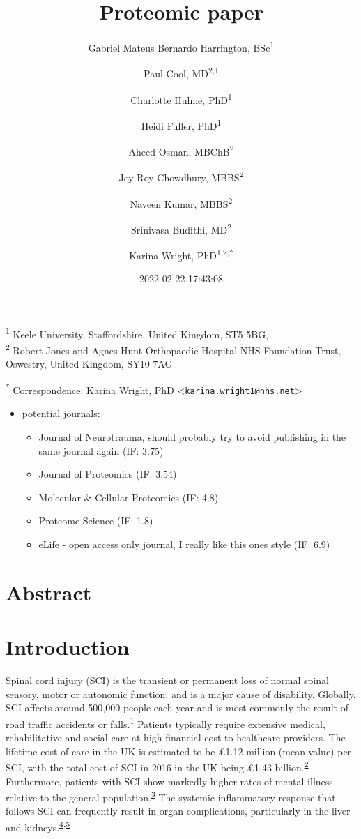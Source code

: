 \documentclass[
]{article}
\title{Proteomic paper}
\author{Gabriel Mateus Bernardo Harrington, BSc\textsuperscript{1} \and Paul Cool, MD\textsuperscript{2,1} \and Charlotte Hulme, PhD\textsuperscript{1} \and Heidi Fuller, PhD\textsuperscript{1} \and Aheed Osman, MBChB\textsuperscript{2} \and Joy Roy Chowdhury, MBBS\textsuperscript{2} \and Naveen Kumar, MBBS\textsuperscript{2} \and Srinivasa Budithi, MD\textsuperscript{2} \and Karina Wright, PhD\textsuperscript{1,2,*}}
\date{2022-02-22 17:43:08}
\providecommand{\tightlist}{%
  \setlength{\itemsep}{0pt}\setlength{\parskip}{0pt}}
\begin{document}
\maketitle

\textsuperscript{1} Keele University, Staffordshire, United Kingdom, ST5 5BG,\\
\textsuperscript{2} Robert Jones and Agnes Hunt Orthopaedic Hospital NHS Foundation Trust, Oswestry, United Kingdom, SY10 7AG

\textsuperscript{*} Correspondence: \href{mailto:karina.wright1@nhs.net}{Karina Wright, PhD \textless{}\href{mailto:karina.wright1@nhs.net}{\nolinkurl{karina.wright1@nhs.net}}\textgreater{}}

\begin{itemize}
\tightlist
\item
  potential journals:

  \begin{itemize}
  \tightlist
  \item
    Journal of Neurotrauma, should probably try to avoid publishing in the same journal again (IF: 3.75)
  \item
    Journal of Proteomics (IF: 3.54)
  \item
    Molecular \& Cellular Proteomics (IF: 4.8)
  \item
    Proteome Science (IF: 1.8)
  \item
    eLife - open access only journal, I really like this ones style (IF: 6.9)
  \end{itemize}
\end{itemize}

\hypertarget{abstract}{%
\section{Abstract}\label{abstract}}

\hypertarget{introduction}{%
\section{Introduction}\label{introduction}}

Spinal cord injury (SCI) is the transient or permanent loss of normal spinal sensory, motor or autonomic function, and is a major cause of disability.
Globally, SCI affects around 500,000 people each year and is most commonly the result of road traffic accidents or falls.\textsuperscript{\protect\hyperlink{ref-crozier-shaw_management_2020}{1}}
Patients typically require extensive medical, rehabilitative and social care at high financial cost to healthcare providers.
The lifetime cost of care in the UK is estimated to be £1.12 million (mean value) per SCI, with the total cost of SCI in 2016 in the UK being £1.43 billion.\textsuperscript{\protect\hyperlink{ref-mcdaid_understanding_2019}{2}}
Furthermore, patients with SCI show markedly higher rates of mental illness relative to the general population.\textsuperscript{\protect\hyperlink{ref-furlan_health_2017}{3}}
The systemic inflammatory response that follows SCI can frequently result in organ complications, particularly in the liver and kidneys.\textsuperscript{\protect\hyperlink{ref-gris_systemic_2008}{4},\protect\hyperlink{ref-sun_multiple_2016}{5}}
\end{document}
